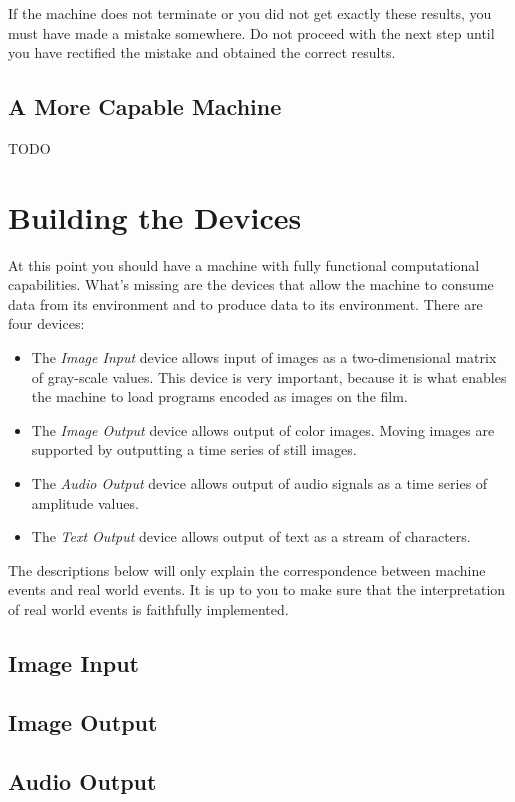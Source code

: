 \documentclass[a4paper,11pt]{article}
\begin{document}
If the machine does not terminate or you did not get exactly these results, you must have made a mistake somewhere.
Do not proceed with the next step until you have rectified the mistake and obtained the correct results.

\subsection{A More Capable Machine}

TODO

\section{Building the Devices}
\label{sec:building-devices}

At this point you should have a machine with fully functional computational capabilities.
What's missing are the devices that allow the machine to consume data from its environment and to produce data to its environment.
There are four devices:
\begin{itemize}
\item The \emph{Image Input} device allows input of images as a two-dimensional matrix of gray-scale values.
  This device is very important, because it is what enables the machine to load programs encoded as images on the film.
\item The \emph{Image Output} device allows output of color images.
  Moving images are supported by outputting a time series of still images.
\item The \emph{Audio Output} device allows output of audio signals as a time series of amplitude values.
\item The \emph{Text Output} device allows output of text as a stream of characters.
\end{itemize}
The descriptions below will only explain the correspondence between machine events and real world events.
It is up to you to make sure that the interpretation of real world events is faithfully implemented.

\subsection{Image Input}

\subsection{Image Output}

\subsection{Audio Output}
\end{document}
